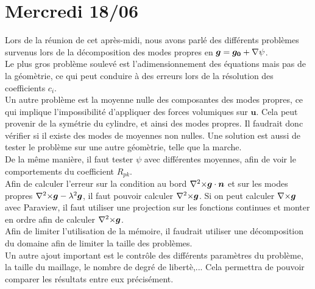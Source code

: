 \section{Mercredi 18/06}

Lors de la réunion de cet après-midi, nous avons parlé des différents problèmes survenus lors de la décomposition des modes propres en $\bm{g}=\bm{g_0}+{\nabla}\psi$.\\
Le plus gros problème soulevé est l'adimensionnement des équations mais pas de la géomètrie, ce qui peut conduire à des erreurs lors de la résolution des coefficients $c_i$.\\
Un autre problème est la moyenne nulle des composantes des modes propres, ce qui implique l'impossibilité d'appliquer des forces volumiques sur $\bm{u}$. Cela peut provenir de la symétrie du cylindre, et ainsi des modes propres. Il faudrait donc vérifier si il existe des modes de moyennes non nulles. Une solution est aussi de tester le problème sur une autre géomètrie, telle que la marche.\\
De la même manière, il faut tester $\psi$ avec différentes moyennes, afin de voir le comportements du coefficient $R_{pk}$.\\

Afin de calculer l'erreur sur la condition au bord ${\nabla^2\times}\bm{g}\cdot\bm{n}$ et sur les modes propres ${\nabla^2\times}\bm{g}-\lambda^2\bm{g}$, il faut pouvoir calculer ${\nabla^2\times}\bm{g}$. Si on peut calculer ${\nabla\times}\bm{g}$ avec Paraview, il faut utiliser une projection sur les fonctions continues et monter en ordre afin de calculer ${\nabla^2\times}\bm{g}$.\\
Afin de limiter l'utilisation de la mémoire, il faudrait utiliser une décomposition du domaine afin de limiter la taille des problèmes.\\

Un autre ajout important est le contrôle des différents paramètres du problème, la taille du maillage, le nombre de degré de libertè,... Cela permettra de pouvoir comparer les résultats entre eux précisément.

